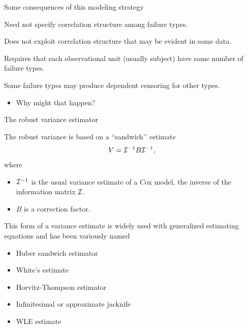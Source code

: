 \documentclass[ignorenonframetext,]{beamer}
\providecommand{\tightlist}{%
  \setlength{\itemsep}{0pt}\setlength{\parskip}{0pt}}
\begin{document}
\begin{frame}{%
\protect\hypertarget{some-consequences-of-this-modeling-strategy}{%
Some consequences of this modeling strategy}}

Need not specify correlation structure among failure types.

Does not exploit correlation structure that may be evident in some data.

Requires that each observational unit (usually subject) have same number
of failure types.

Some failure types may produce dependent censoring for other types.

\begin{itemize}
\tightlist
\item
  Why might that happen?
\end{itemize}

\end{frame}

\begin{frame}{%
\protect\hypertarget{the-robust-variance-estimator}{%
The robust variance estimator}}

The robust variance is based on a ``sandwich’’ estimate \[
   V = {\cal I}^{-1} B {\cal I}^{-1},
\] where

\begin{itemize}
\tightlist
\item
  \({\cal I}^{-1}\) is the usual variance estimate of a Cox model, the
  inverse of the information matrix \({\cal I}\).
\item
  \(B\) is a correction factor.
\end{itemize}

This form of a variance estimate is widely used with generalized
estimating equations and has been variously named

\begin{itemize}
\tightlist
\item
  Huber sandwich estimator\\
\item
  White’s estimate
\item
  Horvitz-Thompson estimator\\
\item
  Infinitesimal or approximate jacknife
\item
  WLE estimate
\end{itemize}

\end{frame}
\end{document}
